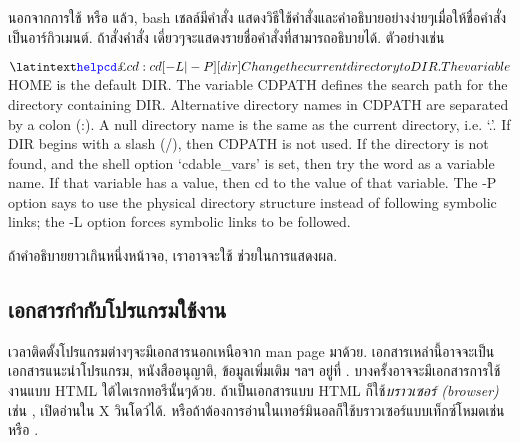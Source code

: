 \begin{thwbr}
นอกจากการใช้  หรือ  แล้ว, bash เชลล์มีคำสั่ง  แสดงวิธีใช้คำสั่งและคำอธิบายอย่างง่ายๆเมื่อให้ชื่อคำสั่งเป็นอาร์กิวเมนต์. ถ้าสั่งคำสั่ง  เดี่ยวๆจะแสดงรายชื่อคำสั่งที่สามารถอธิบายได้.  ตัวอย่างเช่น

\begin{MyExample}
\begin{MyEx}
$ \cin{help cd}
cd: cd [-L|-P] [dir]
    Change the current directory to DIR.  The variable $HOME is the
    default DIR.  The variable CDPATH defines the search path for
    the directory containing DIR.  Alternative directory names in CDPATH
    are separated by a colon (:).  A null directory name is the same as
    the current directory, i.e. `.'.  If DIR begins with a slash (/),
    then CDPATH is not used.  If the directory is not found, and the
    shell option `cdable_vars' is set, then try the word as a variable
    name.  If that variable has a value, then cd to the value of that
    variable.  The -P option says to use the physical directory structure
    instead of following symbolic links; the -L option forces symbolic 
    links to be followed.
\end{MyEx}
\end{MyExample}

ถ้าคำอธิบายยาวเกินหนึ่งหน้าจอ, เราอาจจะใช้  ช่วยในการแสดงผล.

\begin{MyExample}
\end{MyExample}

\subsection{เอกสารกำกับโปรแกรมใช้งาน}
เวลาติดตั้งโปรแกรมต่างๆจะมีเอกสารนอกเหนือจาก man page มาด้วย. เอกสารเหล่านี้อาจจะเป็นเอกสารแนะนำโปรแกรม, หนังสืออนุญาติ, ข้อมูลเพิ่มเติม ฯลฯ อยู่ที่ . บางครั้งอาจจะมีเอกสารการใช้งานแบบ HTML ใต้ไดเรกทอรีนั้นๆด้วย. ถ้าเป็นเอกสารแบบ HTML ก็ใช้\emph{บราวเซอร์ (browser)} เช่น ,  เปิดอ่านใน X วินโดว์ได้. หรือถ้าต้องการอ่านในเทอร์มินอลก็ใช้บราวเซอร์แบบเท็กซ์โหมดเช่น  หรือ .


\end{thwbr}
